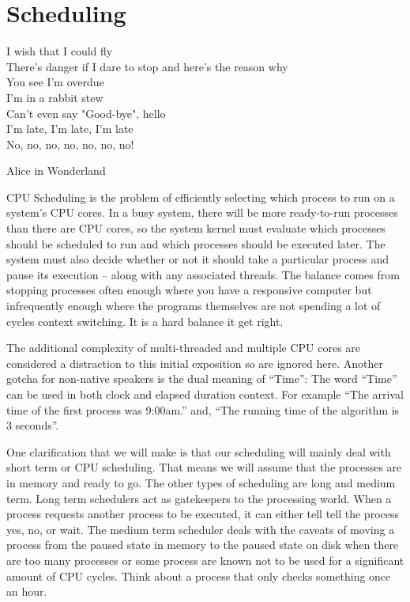 \chapter{Scheduling}

\epigraph{I wish that I could fly\\
There's danger if I dare to stop and here's the reason why\\
You see I'm overdue\\
I'm in a rabbit stew\\
Can't even say "Good-bye", hello\\
I'm late, I'm late, I'm late\\
No, no, no, no, no, no, no!}{Alice in Wonderland}

CPU Scheduling is the problem of efficiently selecting which process to run on a system's CPU cores.
In a busy system, there will be more ready-to-run processes than there are CPU cores, so the system kernel must evaluate which processes should be scheduled to run and which processes should be executed later.
The system must also decide whether or not it should take a particular process and pause its execution -- along with any associated threads.
The balance comes from stopping processes often enough where you have a responsive computer but infrequently enough where the programs themselves are not spending a lot of cycles context switching.
It is a hard balance it get right.

The additional complexity of multi-threaded and multiple CPU cores are considered a distraction to this initial exposition so are ignored here.
Another gotcha for non-native speakers is the dual meaning of ``Time'': The word ``Time'' can be used in both clock and elapsed duration context.
For example ``The arrival time of the first process was 9:00am.'' and, ``The running time of the algorithm is 3 seconds''.

One clarification that we will make is that our scheduling will mainly deal with short term or CPU scheduling.
That means we will assume that the processes are in memory and ready to go.
The other types of scheduling are long and medium term.
Long term schedulers act as gatekeepers to the processing world.
When a process requests another process to be executed, it can either tell tell the process yes, no, or wait.
The medium term scheduler deals with the caveats of moving a process from the paused state in memory to the paused state on disk when there are too many processes or some process are known not to be used for a significant amount of CPU cycles.
Think about a process that only checks something once an hour.

